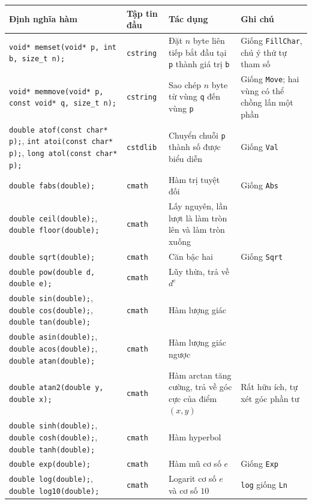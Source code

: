 \documentclass[11pt]{article}
\begin{document}
\begin{center}
\scriptsize
\begin{tabular}{p{}p{}p{}p{}}
\hline
\textbf{Định nghĩa hàm} & \textbf{Tập tin đầu} & \textbf{Tác dụng} & \textbf{Ghi chú}\\
\hline
\verb|void* memset(void* p, int b, size_t n);| & \verb|cstring| &
Đặt \(n\) byte liên tiếp bắt đầu tại \verb|p| thành giá trị \verb|b| &
Giống \verb|FillChar|, chú ý thứ tự tham số\\
\verb|void* memmove(void* p, const void* q, size_t n);| & \verb|cstring| &
Sao chép \(n\) byte từ vùng \verb|q| đến vùng \verb|p| &
Giống \verb|Move|; hai vùng có thể chồng lấn một phần\\
\verb|double atof(const char* p);|, \verb|int atoi(const char* p);|,
\verb|long atol(const char* p);| & \verb|cstdlib| &
Chuyển chuỗi \verb|p| thành số được biểu diễn & Giống \verb|Val|\\
\verb|double fabs(double);| & \verb|cmath| & Hàm trị tuyệt đối & Giống \verb|Abs|\\
\verb|double ceil(double);|, \verb|double floor(double);| & \verb|cmath| &
Lấy nguyên, lần lượt là làm tròn lên và làm tròn xuống & \\
\verb|double sqrt(double);| & \verb|cmath| & Căn bậc hai & Giống \verb|Sqrt|\\
\verb|double pow(double d, double e);| & \verb|cmath| & Lũy thừa, trả về \(d^e\) & \\
\verb|double sin(double);|, \verb|double cos(double);|, \verb|double tan(double);| &
\verb|cmath| & Hàm lượng giác & \\
\verb|double asin(double);|, \verb|double acos(double);|, \verb|double atan(double);| &
\verb|cmath| & Hàm lượng giác ngược & \\
\verb|double atan2(double y, double x);| & \verb|cmath| &
Hàm arctan tăng cường, trả về góc cực của điểm \((x,y)\) &
Rất hữu ích, tự xét góc phần tư\\
\verb|double sinh(double);|, \verb|double cosh(double);|, \verb|double tanh(double);| &
\verb|cmath| & Hàm hyperbol & \\
\verb|double exp(double);| & \verb|cmath| & Hàm mũ cơ số \(e\) & Giống \verb|Exp|\\
\verb|double log(double);|, \verb|double log10(double);| & \verb|cmath| &
Logarit cơ số \(e\) và cơ số \(10\) & \verb|log| giống \verb|Ln|\\
\hline
\end{tabular}
\end{center}
\end{document}
